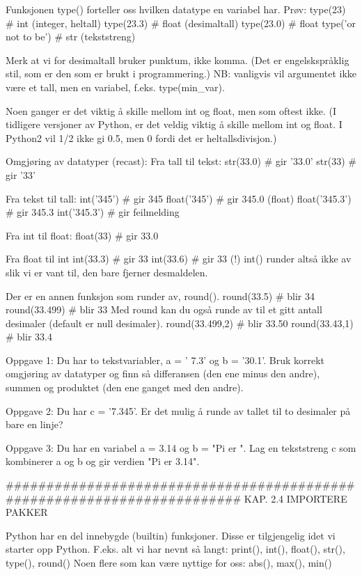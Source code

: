 \documentclass[a4paper,11pt,utf8]{book}
\begin{document}
Funksjonen type() forteller oss hvilken datatype en variabel har. 
Prøv: 
type(23)               # int    (integer, heltall) 
type(23.3)             # float  (desimaltall) 
type(23.0)             # float  
type('or not to be')   # str    (tekststreng) 

Merk at vi for desimaltall bruker punktum, ikke komma.
(Det er engelskspråklig stil, som er den som er brukt i programmering.) 
NB: vanligvis vil argumentet ikke være et tall, men en variabel, f.eks. type(min_var). 

Noen ganger er det viktig å skille mellom int og float, men som oftest ikke. 
(I tidligere versjoner av Python, er det veldig viktig å skille mellom int og float.
I Python2 vil 1/2 ikke gi 0.5, men 0 fordi det er heltallsdivisjon.) 

Omgjøring av datatyper (recast): 
Fra tall til tekst: 
str(33.0)        # gir '33.0'
str(33)          # gir '33'

Fra tekst til tall: 
int('345')       # gir 345
float('345')     # gir 345.0  (float) 
float('345.3')   # gir 345.3 
int('345.3')     # gir feilmelding

Fra int til float: 
float(33)        # gir 33.0

Fra float til int 
int(33.3)        # gir 33
int(33.6)        # gir 33 (!) 
int() runder altså ikke av slik vi er vant til, den bare fjerner desmaldelen. 


Der er en annen funksjon som runder av, round(). 
round(33.5)      # blir 34 
round(33.499)    # blir 33
Med round kan du også runde av til et gitt antall desimaler (default er null desimaler).
round(33.499,2)  # blir 33.50
round(33.43,1)   # blir 33.4



Oppgave 1: Du har to tekstvariabler, a = ' 7.3' og b = '30.1'.
Bruk korrekt omgjøring av datatyper og finn så differansen (den ene minus den andre),
summen og produktet (den ene ganget med den andre). 

Oppgave 2: Du har c = '7.345'.
Er det mulig å runde av tallet til to desimaler på bare en linje?

Oppgave 3: Du har en variabel a = 3.14 og b = "Pi er ".
Lag en tekststreng c som kombinerer a og b og gir verdien "Pi er 3.14". 



######################################################################## 
KAP. 2.4  IMPORTERE PAKKER

Python har en del innebygde (builtin) funksjoner.
Disse er tilgjengelig idet vi starter opp Python.
F.eks. alt vi har nevnt så langt: print(), int(), float(), str(), type(), round()
Noen flere som kan være nyttige for oss: abs(), max(), min() 
\end{document}
